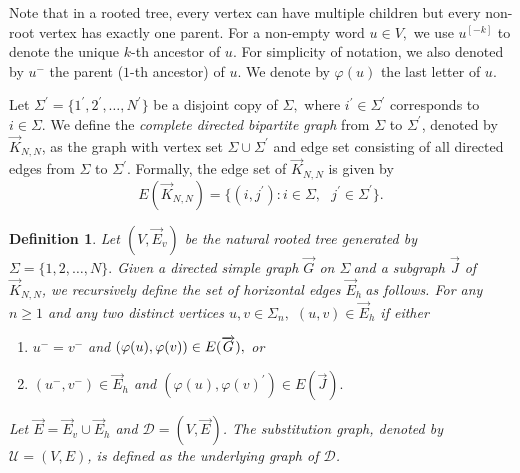 \documentclass[reqno]{amsart}
\theoremstyle{plain}
\newtheorem{definition}{Definition}
\numberwithin{equation}{section}
\begin{document}
Note that in a rooted tree, every vertex can have multiple children but
every non-root vertex has exactly one parent. For a non-empty word $u\in V,$
we use $u^{[-k]}$ to denote the unique $k$-th ancestor of $u.$ For
simplicity of notation, we also denoted by $u^{-}$ the parent ($1$-th
ancestor) of $u$. We denote by $\varphi (u)$ the last letter of $u.$

Let $\Sigma ^{\prime }=\{1^{\prime },2^{\prime },\ldots ,N^{\prime }\}$ be a
disjoint copy of $\Sigma ,$ where $i^{\prime }\in \Sigma ^{\prime }$
corresponds to $i\in \Sigma .$ We define the \emph{complete directed
bipartite graph }from $\Sigma $ to $\Sigma ^{\prime }$, denoted by $%
\overrightarrow{K}_{N,N}$, as the graph with vertex set $\Sigma \cup \Sigma
^{\prime }$ and edge set consisting of all directed edges from $\Sigma $ to $%
\Sigma ^{\prime }.$ Formally, the edge set of $\overrightarrow{K}_{N,N}$ is
given by%
\begin{equation*}
E(\overrightarrow{K}_{N,N})=\{(i,j^{\prime }):i\in \Sigma ,\text{ }j^{\prime
}\in \Sigma ^{\prime }\}.
\end{equation*}

\begin{definition}
Let $(V,\overrightarrow{E}_{v})$ be the natural rooted tree generated by $%
\Sigma =\{1,2,\ldots ,N\}.$ Given a directed simple graph $\overrightarrow{G}
$ on $\Sigma \ $and a subgraph $\overrightarrow{J}$ of $\overrightarrow{K}%
_{N,N}$, we recursively define the set of \emph{horizontal edges} $%
\overrightarrow{E}_{h}\ $as follows. For any $n\geq 1$ and any two distinct
vertices $u,v\in \Sigma _{n},$ $(u,v)\in \overrightarrow{E}_{h}$ if either

\begin{enumerate}
\item[(i)] $u^{-}=v^{-}$ and $(\varphi (u),\varphi (v))\in E(\overrightarrow{%
G}),$ or

\item[(ii)] $(u^{-},v^{-})\in \overrightarrow{E}_{h}$ and $(\varphi
(u),\varphi (v)^{\prime })\in E(\overrightarrow{J}).$
\end{enumerate}

Let $\overrightarrow{E}=\overrightarrow{E}_{v}\cup \overrightarrow{E}_{h}$
and $\mathcal{D}=(V,\overrightarrow{E})$. The \emph{substitution graph},
denoted by $\mathcal{U}=(V,E)$, is defined as the \emph{underlying graph} of 
$\mathcal{D}$.
\end{definition}
\end{document}
